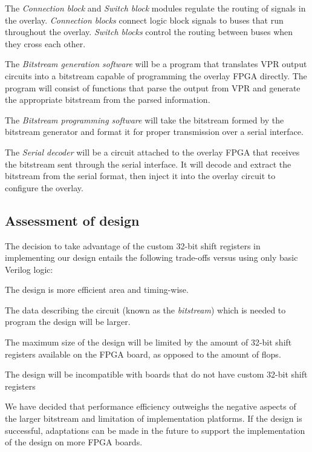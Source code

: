 The \emph{Connection block} and \emph{Switch block} modules regulate the routing of signals in the overlay.
\emph{Connection blocks} connect logic block signals to buses that run throughout the 
overlay.
\emph{Switch blocks} control the routing between buses when they cross each other.

The \emph{Bitstream generation software} will be a program that translates VPR output circuits into a 
bitstream capable of programming the overlay FPGA directly.
The program will consist of functions that parse the output from VPR and generate the 
appropriate bitstream from the parsed information.

The \emph{Bitstream programming software} will take the bitstream formed by the bitstream generator 
and format it for proper transmission over a serial interface.

The \emph{Serial decoder} will be a circuit attached to the overlay FPGA that receives the 
bitstream sent through the serial interface.
It will decode and extract the bitstream 
from the serial format, then inject it into the overlay circuit to configure the 
overlay.



\subsection{Assessment of design}

The decision to take advantage of the custom 32-bit shift registers in implementing our design entails the following trade-offs versus using only basic Verilog logic:
\begin{itemlist}
	\item The design is more efficient area and timing-wise.
	\item The data describing the circuit (known as the \emph{bitstream}) which is needed to program the design will be larger.
	\item The maximum size of the design will be limited by the amount of 32-bit shift registers available on the FPGA board, as opposed to the amount of flops.
	\item The design will be incompatible with boards that do not have custom 32-bit shift registers
\end{itemlist}

We have decided that performance efficiency outweighs the negative aspects of the larger bitstream and limitation of implementation platforms.
If the design is successful, adaptations can be made in the future to support the implementation of the design on more FPGA boards.



